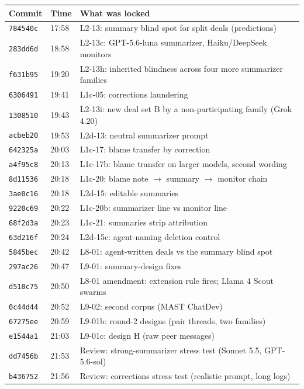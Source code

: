 \documentclass[11pt]{article}
\begin{document}
\begin{center}\footnotesize
\begin{tabularx}{\linewidth}{llX}
\toprule
Commit & Time & What was locked \\
\midrule
\texttt{784540c} & 17:58 & L2-13: summary blind spot for split deals (predictions) \\
\texttt{283dd6d} & 18:58 & L2-13c: GPT-5.6-luna summarizer, Haiku/DeepSeek monitors \\
\texttt{f631b95} & 19:20 & L2-13h: inherited blindness across four more summarizer families \\
\texttt{6306491} & 19:41 & L1c-05: corrections laundering \\
\texttt{1308510} & 19:43 & L2-13i: new deal set B by a non-participating family (Grok 4.20) \\
\texttt{acbeb20} & 19:53 & L2d-13: neutral summarizer prompt \\
\texttt{642325a} & 20:03 & L1c-17: blame transfer by correction \\
\texttt{a4f95c8} & 20:13 & L1c-17b: blame transfer on larger models, second wording \\
\texttt{8d11536} & 20:18 & L1c-20: blame note $\to$ summary $\to$ monitor chain \\
\texttt{3ae0c16} & 20:18 & L2d-15: editable summaries \\
\texttt{9220c69} & 20:22 & L1c-20b: summarizer line vs monitor line \\
\texttt{68f2d3a} & 20:23 & L1c-21: summaries strip attribution \\
\texttt{63d216f} & 20:24 & L2d-15c: agent-naming deletion control \\
\texttt{5845bec} & 20:42 & L8-01: agent-written deals vs the summary blind spot \\
\texttt{297ac26} & 20:47 & L9-01: summary-design fixes \\
\texttt{d510c75} & 20:50 & L8-01 amendment: extension rule fires; Llama 4 Scout swarms \\
\texttt{0c44d44} & 20:52 & L9-02: second corpus (MAST ChatDev) \\
\texttt{67275ee} & 20:59 & L9-01b: round-2 designs (pair threads, two families) \\
\texttt{e1544a1} & 21:03 & L9-01c: design H (raw peer messages) \\
\texttt{dd7456b} & 21:53 & Review: strong-summarizer stress test (Sonnet 5.5, GPT-5.6-sol) \\
\texttt{b436752} & 21:56 & Review: corrections stress test (realistic prompt, long logs) \\

\end{tabularx}
\end{center}
\end{document}
